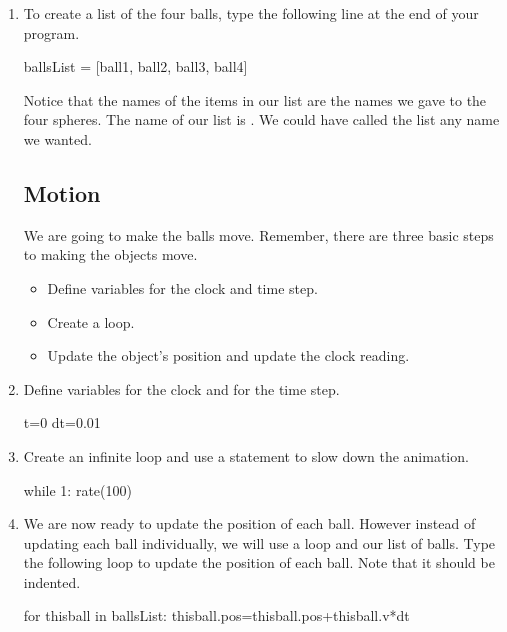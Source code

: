 \begin{enumerate}
\item To create a list of the four balls, type the following line at the end of your program.

\begin{myvpython}
ballsList = [ball1, ball2, ball3, ball4]
\end{myvpython}

Notice that the names of the items in our list are the names we gave to the four spheres. The name of our list is . We could have called the list any name we wanted.

\subsection*{Motion}

We are going to make the balls move. Remember, there are three basic steps to making the objects move.

\begin{itemize}
	\item Define variables for the clock and time step.
	\item Create a  loop.
	\item Update the object's position and update the clock reading.
\end{itemize}

\item Define variables for the clock and for the time step.

\begin{myvpython}
t=0
dt=0.01
\end{myvpython}

\item Create an infinite  loop and use a  statement to slow down the animation.

\begin{myvpython}
while 1:
    rate(100)
\end{myvpython}

\item We are now ready to update the position of each ball. However instead of updating each ball individually, we will use a  loop and our list of balls. Type the following loop to update the position of each ball. Note that it should be indented.

\begin{myvpython}
    for thisball in ballsList:
        thisball.pos=thisball.pos+thisball.v*dt    
\end{myvpython}


\end{enumerate}
